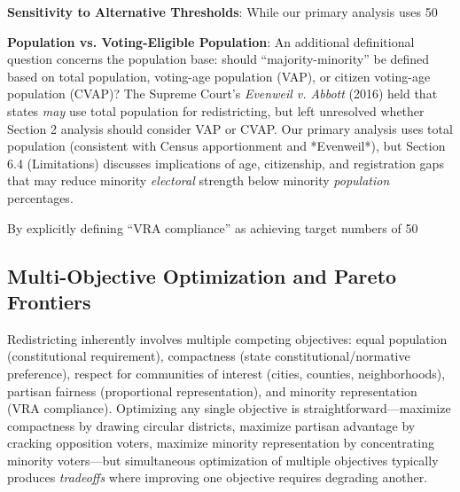 \textbf{Sensitivity to Alternative Thresholds}: While our primary analysis uses 50%

\textbf{Population vs. Voting-Eligible Population}: An additional definitional question concerns the population base: should ``majority-minority'' be defined based on total population, voting-age population (VAP), or citizen voting-age population (CVAP)? The Supreme Court's \emph{Evenweil v. Abbott} (2016) held that states \emph{may} use total population for redistricting, but left unresolved whether Section 2 analysis should consider VAP or CVAP. Our primary analysis uses total population (consistent with Census apportionment and *Evenweil*), but Section 6.4 (Limitations) discusses implications of age, citizenship, and registration gaps that may reduce minority \emph{electoral} strength below minority \emph{population} percentages.

By explicitly defining ``VRA compliance'' as achieving target numbers of 50%

\subsection{Multi-Objective Optimization and Pareto Frontiers}

Redistricting inherently involves multiple competing objectives: equal population (constitutional requirement), compactness (state constitutional/normative preference), respect for communities of interest (cities, counties, neighborhoods), partisan fairness (proportional representation), and minority representation (VRA compliance). Optimizing any single objective is straightforward---maximize compactness by drawing circular districts, maximize partisan advantage by cracking opposition voters, maximize minority representation by concentrating minority voters---but simultaneous optimization of multiple objectives typically produces \emph{tradeoffs} where improving one objective requires degrading another.

